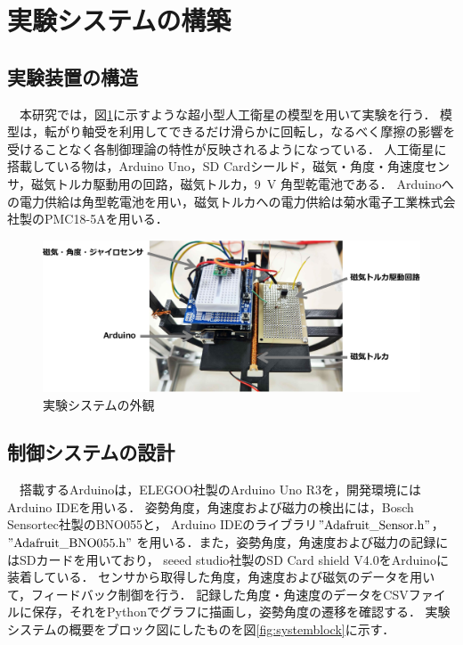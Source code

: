 \section{実験システムの構築}
\subsection{実験装置の構造}
　本研究では，図\ref{fig:system}に示すような超小型人工衛星の模型を用いて実験を行う．
模型は，転がり軸受を利用してできるだけ滑らかに回転し，なるべく摩擦の影響を受けることなく各制御理論の特性が反映されるようになっている．
人工衛星に搭載している物は，Arduino Uno，SD Cardシールド，磁気・角度・角速度センサ，磁気トルカ駆動用の回路，磁気トルカ，9~V 角型乾電池である．
Arduinoへの電力供給は角型乾電池を用い，磁気トルカへの電力供給は菊水電子工業株式会社製のPMC18-5Aを用いる．


\begin{figure}[H]
	\centering
		\includegraphics[scale=0.4]{./figure/実験システム.pdf}
		\caption{実験システムの外観}
		\label{fig:system}
\end{figure}



\subsection{制御システムの設計}

　搭載するArduinoは，ELEGOO社製のArduino Uno R3を，開発環境にはArduino IDEを用いる．
姿勢角度，角速度および磁力の検出には，Bosch Sensortec社製のBNO055と，
Arduino IDEのライブラリ$"\mathrm{Adafruit\_Sensor.h}"$，$"\mathrm{Adafruit\_BNO055.h}"$
を用いる．また，姿勢角度，角速度および磁力の記録にはSDカードを用いており，
seeed studio社製のSD Card shield V4.0をArduinoに装着している．
センサから取得した角度，角速度および磁気のデータを用いて，フィードバック制御を行う．
記録した角度・角速度のデータをCSVファイルに保存，それをPythonでグラフに描画し，姿勢角度の遷移を確認する．
実験システムの概要をブロック図にしたものを図\ref{fig:systemblock}に示す．

